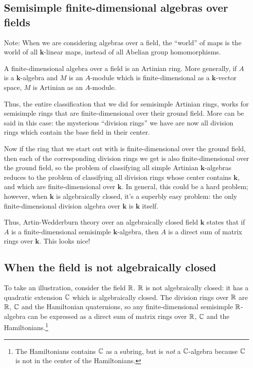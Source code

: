 \documentclass[a4paper]{amsart}
\newcommand{\field}{\mathbf{k}}
\begin{document}
\subsection{Semisimple finite-dimensional algebras over fields}

Note: When we are considering algebras over a field, the ``world'' of
maps is the world of all $\field$-linear maps, instead of all Abelian
group homomorphisms.

A finite-dimensional algebra over a field is an Artinian ring. More
generally, if $A$ is a $\field$-algebra and $M$ is an $A$-module which
is finite-dimensional as a $\field$-vector space, $M$ is Artinian as
an $A$-module.

Thus, the entire classification that we did for semisimple Artinian
rings, works for semisimple rings that are finite-dimensional over
their ground field. More can be said in this case: the mysterious
``division rings'' we have are now all division rings which contain
the base field in their center.

Now if the ring that we start out with is finite-dimensional over the
ground field, then each of the corresponding division rings we get is
also finite-dimensional over the ground field, so the problem of
classifying all simple Artinian $\field$-algebras reduces to the
problem of classifying all division rings whose center contains
$\field$, and which are finite-dimensional over $\field$. In general,
this could be a hard problem; however, when $\field$ is algebraically
closed, it's a superbly easy problem: the only finite-dimensional
division algebra over $\field$ is $\field$ itself.

Thus, Artin-Wedderburn theory over an algebraically closed field
$\field$ states that if $A$ is a finite-dimensional semisimple
$\field$-algebra, then $A$ is a direct sum of matrix rings over
$\field$. This looks nice!

\subsection{When the field is not algebraically closed}

To take an illustration, consider the field $\mathbb{R}$. $\mathbb{R}$ is not
algebraically closed: it has a quadratic extension $\mathbb{C}$ which is
algebraically closed. The division rings over $\mathbb{R}$ are $\mathbb{R}$, $\mathbb{C}$ and
the Hamiltonian quaternions, so any finite-dimensional semisimple
$\mathbb{R}$-algebra can be expressed as a direct sum of matrix rings over
$\mathbb{R}$, $\mathbb{C}$ and the Hamiltonians.\footnote{The Hamiltonians contains $\mathbb{C}$ as a
  subring, but is {\em not} a $\mathbb{C}$-algebra because $\mathbb{C}$ is not in the
  center of the Hamiltonians.}
\end{document}
